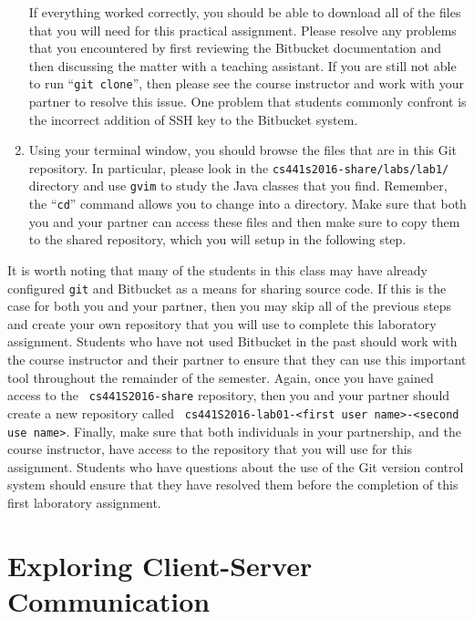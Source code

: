 \begin{enumerate}
    If everything worked correctly, you should be able to download all of the files that you will need for this
    practical assignment. Please resolve any problems that you encountered by first reviewing the Bitbucket
    documentation and then discussing the matter with a teaching assistant.  If you are still not able to run ``{\tt git
      clone}'', then please see the course instructor and work with your partner to resolve this issue. One problem that
      students commonly confront is the incorrect addition of SSH key to the Bitbucket system.

  \item Using your terminal window, you should browse the files that are in this Git repository.  In particular, please
    look in the {\tt cs441s2016-share/labs/lab1/} directory and use {\tt gvim} to study the Java classes that
    you find.  Remember, the ``{\tt cd}'' command allows you to change into a directory. Make sure that both you and
    your partner can access these files and then make sure to copy them to the shared repository, which you will
    setup in the following step.

  \end{enumerate}

  It is worth noting that many of the students in this class may have already configured {\tt git} and Bitbucket as a
  means for sharing source code. If this is the case for both you and your partner, then you may skip all of the previous
  steps and create your own repository that you will use to complete this laboratory assignment. Students who have not
  used Bitbucket in the past should work with the course instructor and their partner to ensure that they can use this
  important tool throughout the remainder of the semester. Again, once you have gained access to the {\tt
    cs441S2016-share} repository, then you and your partner should create a new repository called {\tt
  cs441S2016-lab01-<first user name>-<second use name>}. Finally, make sure that both individuals in your partnership, and
  the course instructor, have access to the repository that you will use for this assignment. Students who have questions
  about the use of the Git version control system should ensure that they have resolved them before the completion of this
  first laboratory assignment.

\section*{Exploring Client-Server Communication}

